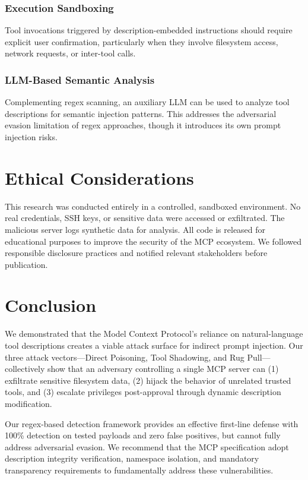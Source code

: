 \documentclass[conference]{IEEEtran}
\begin{document}
\subsubsection{Execution Sandboxing}
Tool invocations triggered by description-embedded instructions should require explicit user confirmation, particularly when they involve filesystem access, network requests, or inter-tool calls.

\subsubsection{LLM-Based Semantic Analysis}
Complementing regex scanning, an auxiliary LLM can be used to analyze tool descriptions for semantic injection patterns. This addresses the adversarial evasion limitation of regex approaches, though it introduces its own prompt injection risks.

\section{Ethical Considerations}
\label{sec:ethics}

This research was conducted entirely in a controlled, sandboxed environment. No real credentials, SSH keys, or sensitive data were accessed or exfiltrated. The malicious server logs synthetic data for analysis. All code is released for educational purposes to improve the security of the MCP ecosystem. We followed responsible disclosure practices and notified relevant stakeholders before publication.

\section{Conclusion}
\label{sec:conclusion}

We demonstrated that the Model Context Protocol's reliance on natural-language tool descriptions creates a viable attack surface for indirect prompt injection. Our three attack vectors—Direct Poisoning, Tool Shadowing, and Rug Pull—collectively show that an adversary controlling a single MCP server can (1) exfiltrate sensitive filesystem data, (2) hijack the behavior of unrelated trusted tools, and (3) escalate privileges post-approval through dynamic description modification.

Our regex-based detection framework provides an effective first-line defense with 100\% detection on tested payloads and zero false positives, but cannot fully address adversarial evasion. We recommend that the MCP specification adopt description integrity verification, namespace isolation, and mandatory transparency requirements to fundamentally address these vulnerabilities.
\end{document}
